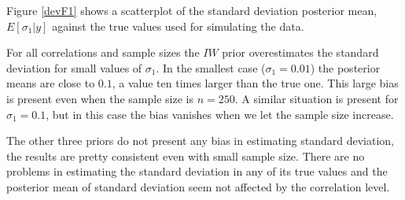 \documentclass[a4paper]{article}
\begin{document}
Figure \ref{devF1} shows a scatterplot of the standard deviation posterior mean, $E[\sigma_1\vert y]$  against the true values used for simulating the data. 

For all correlations and sample sizes the $IW$ prior overestimates the standard deviation for small values of $\sigma_1$.  In the smallest case ($\sigma_1=0.01$) the posterior means are close to $0.1$, a value ten times larger than the true one. This large bias is present even when the sample size is $n=250$.  A similar situation is present for $\sigma_1=0.1$, but in this case the bias vanishes when we let the sample size increase.  

The other three priors do not present any bias in estimating standard deviation, the results are pretty consistent even with small sample size. There are no problems in estimating the standard deviation in any of its true values and the posterior mean of standard deviation seem not affected by the correlation level.  
\end{document}
